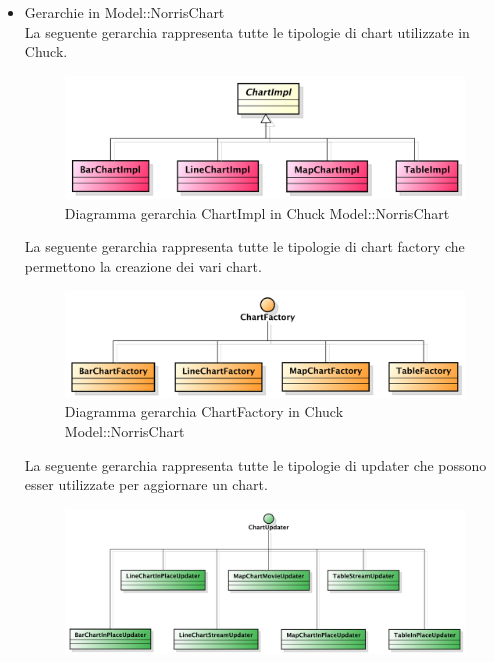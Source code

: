            \begin{itemize}
                \item Gerarchie in Model::NorrisChart \\
                    La seguente gerarchia rappresenta tutte le tipologie di chart utilizzate in Chuck.
                    \begin{figure}[H]
                        \centering
                        \includegraphics{DefinizioneDiProdotto/Pics/Gerarchie/ModelChartImpl.pdf}
                        \caption{Diagramma gerarchia ChartImpl in Chuck Model::NorrisChart }
                    \end{figure}
                    La seguente gerarchia rappresenta tutte le tipologie di chart factory che permettono la creazione dei vari chart.
                    \begin{figure}[H]
                        \centering
                        \includegraphics{DefinizioneDiProdotto/Pics/Gerarchie/ModelFactory.pdf}
                        \caption{Diagramma gerarchia ChartFactory in Chuck Model::NorrisChart}
                    \end{figure}
                    La seguente gerarchia rappresenta tutte le tipologie di updater che possono esser utilizzate per aggiornare un chart.
                    \begin{figure}[H]
                        \centering
                        \includegraphics{DefinizioneDiProdotto/Pics/Gerarchie/ModelUpdater.pdf}

\end{figure}
\end{itemize}
